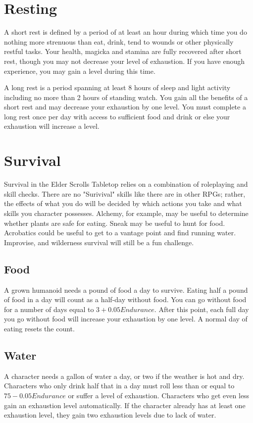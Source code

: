 \documentclass[12pt]{book}
\begin{document}
\section{Resting}
A short rest is defined by a period of at least an hour during which time you do nothing more strenuous than eat, drink, tend to wounds or other physically restful tasks. Your health, magicka and stamina are fully recovered after short rest, though you may not decrease your level of exhaustion. If you have enough experience, you may gain a level during this time.

A long rest is a period spanning at least 8 hours of sleep and light activity including no more than 2 hours of standing watch. You gain all the benefits of a short rest and may decrease your exhaustion by one level. You must complete a long rest once per day with access to sufficient food and drink or else your exhaustion will increase a level.

\section{Survival}
Survival in the Elder Scrolls Tabletop relies on a combination of roleplaying and skill checks. There are no "Surivival" skills like there are in other RPGs; rather, the effects of what you do will be decided by which actions you take and what skills you character possesses. Alchemy, for example, may be useful to determine whether plants are safe for eating. Sneak may be useful to hunt for food. Acrobatics could be useful to get to a vantage point and find running water. Improvise, and wilderness survival will still be a fun challenge.

\subsection{Food}
A grown humanoid needs a pound of food a day to survive. Eating half a pound of food in a day will count as a half-day without food. You can go without food for a number of days equal to $3+0.05Endurance$. After this point, each full day you go without food will increase your exhaustion by one level. A normal day of eating resets the count.

\subsection{Water}
A character needs a gallon of water a day, or two if the weather is hot and dry. Characters who only drink half that in a day must roll less than or equal to $75-0.05Endurance$ or suffer a level of exhaustion. Characters who get even less gain an exhaustion level automatically. If the character already has at least one exhaustion level, they gain two exhaustion levels due to lack of water.
\end{document}
